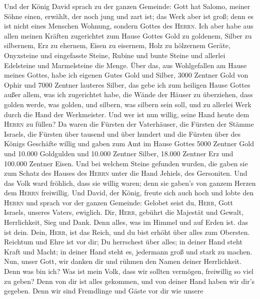  Und der König David sprach zu der ganzen Gemeinde: Gott
hat Salomo, meiner Söhne einen, erwählt, der noch jung und zart ist; das
Werk aber ist groß; denn es ist nicht eines Menschen Wohnung, sondern
Gottes des \textsc{Herrn}.  Ich aber habe aus allen meinen
Kräften zugerichtet zum Hause Gottes Gold zu goldenem, Silber zu
silbernem, Erz zu ehernem, Eisen zu eisernem, Holz zu hölzernem Geräte,
Onyxsteine und eingefasste Steine, Rubine und bunte Steine und allerlei
Edelsteine und Marmelsteine die Menge.  Über das, aus
Wohlgefallen am Hause meines Gottes, habe ich eigenen Gutes Gold und
Silber,  3000 Zentner Gold von Ophir und 7000 Zentner
lauteres Silber, das gebe ich zum heiligen Hause Gottes außer allem, was
ich zugerichtet habe, die Wände der Häuser zu überziehen, 
dass golden werde, was golden, und silbern, was silbern sein soll, und
zu allerlei Werk durch die Hand der Werkmeister. Und wer ist nun willig,
seine Hand heute dem \textsc{Herrn} zu füllen?  Da waren
die Fürsten der Vaterhäuser, die Fürsten der Stämme Israels, die Fürsten
über tausend und über hundert und die Fürsten über des Königs Geschäfte
willig  und gaben zum Amt im Hause Gottes 5000 Zentner
Gold und 10.000 Goldgulden und 10.000 Zentner Silber, 18.000 Zentner Erz
und 100.000 Zentner Eisen.  Und bei welchem Steine
gefunden wurden, die gaben sie zum Schatz des Hauses des \textsc{Herrn}
unter die Hand Jehiels, des Gersoniten.  Und das Volk ward
fröhlich, dass sie willig waren; denn sie gaben's von ganzem Herzen dem
\textsc{Herrn} freiwillig. Und David, der König, freute sich auch hoch
 und lobte den \textsc{Herrn} und sprach vor der ganzen
Gemeinde: Gelobet seist du, \textsc{Herr}, Gott Israels, unseres Vaters,
ewiglich.  Dir, \textsc{Herr}, gebührt die Majestät und
Gewalt, Herrlichkeit, Sieg und Dank. Denn alles, was im Himmel und auf
Erden ist. das ist dein. Dein, \textsc{Herr}, ist das Reich, und du bist
erhöht über alles zum Obersten.  Reichtum und Ehre ist
vor dir; Du herrschest über alles; in deiner Hand steht Kraft und Macht;
in deiner Hand steht es, jedermann groß und stark zu machen.
 Nun, unser Gott, wir danken dir und rühmen den Namen
deiner Herrlichkeit.  Denn was bin ich? Was ist mein
Volk, dass wir sollten vermögen, freiwillig so viel zu geben? Denn von
dir ist alles gekommen, und von deiner Hand haben wir dir's gegeben.
 Denn wir sind Fremdlinge und Gäste vor dir wie unsere
